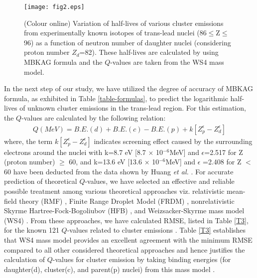 \documentclass[preprint,10pt]{elsarticle}
\begin{document}
\begin{figure}[!htbp]
\centering
\texttt{[image: fig2.eps]}
\caption{(Colour online) Variation of half-lives of various cluster emissions from experimentally known isotopes of trans-lead nuclei (86$\leq$Z$\leq$96) as a function of neutron number of daughter nuclei (considering proton number $Z_{d}$=82). These half-lives are calculated by using MBKAG formula and the $Q$-values are taken from the WS4 mass model\cite{ws42014}.}\label{clusters}
\end{figure}
In the next step of our study, we have utilized the degree of accuracy of MBKAG formula, as exhibited in Table \ref{table-formulas}, to predict the logarithmic half-lives of unknown cluster emissions in the trans-lead region. For this estimation, the $Q$-values are calculated by the following relation:
\begin{eqnarray}
 Q (MeV) = B.E. (d)+ B.E. (c)-B.E. (p) + k[Z_{p}^{\epsilon}-Z_{d}^{\epsilon}]
 \label{Q_value}
 \end{eqnarray}
where, the term $k[Z_{p}^{\epsilon}-Z_{d}^{\epsilon}]$ indicates screening effect caused by the surrounding electrons around the nuclei \cite{Denisov2009prc} with k=8.7 eV [8.7 $\times$ 10$^{-6}$MeV] and $\epsilon$=2.517 for Z (proton number) $\geq$ 60, and k=13.6 eV [13.6 $\times$
10$^{-6}$MeV] and $\epsilon$ =2.408 for Z $<$ 60 have been deducted from the data shown by Huang \textit{et al.} \cite{Huang1976}. For accurate prediction of theoretical $Q$-values, we have selected an effective and reliable possible treatment among various theoretical approaches viz. relativistic mean-field theory (RMF) \cite{Singh2012,saxenaIJMPA2019,saxenaPLB2019,saxena2017,singh2020,saxenaplb2017}, Finite Range Droplet Model (FRDM) \cite{moller2019}, nonrelativistic Skyrme Hartree-Fock-Bogoliubov (HFB) \cite{hfb2004}, and Weizsacker-Skyrme mass model (WS4) \cite{ws42014}. From these approaches, we have calculated RMSE, listed in Table \ref{T3}, for the known 121 $Q$-values related to cluster emissions \cite{Bonetti2007,Price1989,Royer2001,Soylu2021}. Table \ref{T3} establishes that WS4 mass model provides an excellent agreement with the minimum RMSE compared to all other considered theoretical approaches and hence justifies the calculation of $Q$-values for cluster emission by taking binding energies (for daughter(d), cluster(c), and parent(p) nuclei) from this mass model \cite{ws42014}. \par

\begin{table}[!htbp]
\caption{RMSE of various mass models for $Q$-value data for cluster emission.}
\centering
{}
\label{T3}
\end{table}
\end{document}
